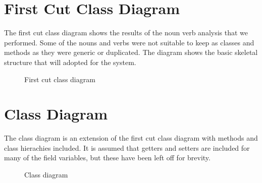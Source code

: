 \documentclass[a4paper]{article}
\begin{document}


\clearpage

\section{First Cut Class Diagram}

The first cut class diagram shows the results of the noun verb analysis that we
performed. Some of the nouns and verbs were not suitable to keep as classes and
methods as they were generic or duplicated. The diagram shows the basic
skeletal structure that will adopted for the system.

\begin{figure}[h!]
	\centering
	\caption{First cut class diagram}
\end{figure}
\clearpage

\section{Class Diagram}

The class diagram is an extension of the first cut class diagram with methods
and class hierachies included. It is assumed that getters and setters are
included for many of the field variables, but these have been left off for
brevity.

\begin{figure}[h!]
	\centering
	\caption{Class diagram}
\end{figure}
\clearpage
\end{document}
